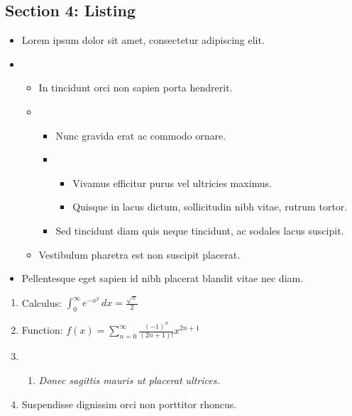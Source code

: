 \documentclass{article}
\begin{document}
\subsection*{Section 4: Listing }
\begin{itemize}
\item 
Lorem ipsum dolor sit amet, consectetur adipiscing elit.
\item[] 
\begin{itemize}
\item 
In tincidunt orci non sapien porta hendrerit.
\item[] 
\begin{itemize}
\item 
Nunc gravida erat ac commodo ornare.
\item[] 
\begin{itemize}
\item 
Vivamus efficitur purus vel ultricies maximus.
\item 
Quisque in lacus dictum, sollicitudin nibh vitae, rutrum tortor.

\end{itemize}
\item 
Sed tincidunt diam quis neque tincidunt, ac sodales lacus suscipit.

\end{itemize}
\item 
Vestibulum pharetra est non suscipit placerat.

\end{itemize}
\item 
Pellentesque eget sapien id nibh placerat blandit vitae nec diam.

\end{itemize}

\begin{enumerate}
\item 
Calculus: $\int_0^\infty e^{-x^2} \, dx = \frac{\sqrt{\pi}}{2}$
\item 
Function: $f(x) = \sum_{n=0}^{\infty} \frac{(-1)^n}{(2n+1)!} x^{2n+1}
$
\item[] 
\begin{enumerate}
\item 
\textit{Donec sagittis mauris ut placerat ultrices.}

\end{enumerate}
\item 
Suspendisse dignissim orci non porttitor rhoncus.

\end{enumerate}
\end{document}
